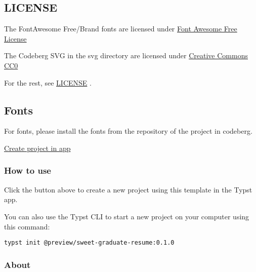 
\subsection{LICENSE}\label{license}

The FontAwesome Free/Brand fonts are licensed under
\href{https://github.com/FortAwesome/Font-Awesome?tab=License-1-ov-file}{Font
Awesome Free License}

The Codeberg SVG in the svg directory are licensed under
\href{https://codeberg.org/Codeberg/Design/src/commit/ac514aa9aaa2457d4af3c3e13df3ab136d22a49a/LICENSE}{Creative
Commons CC0}

For the rest, see
\href{https://github.com/typst/packages/raw/main/packages/preview/sweet-graduate-resume/0.1.0/LICENSE}{LICENSE}
.

\subsection{Fonts}\label{fonts}

For fonts, please install the fonts from the repository of the project
in codeberg.

\href{/app?template=sweet-graduate-resume&version=0.1.0}{Create project
in app}

\subsubsection{How to use}\label{how-to-use}

Click the button above to create a new project using this template in
the Typst app.

You can also use the Typst CLI to start a new project on your computer
using this command:

\begin{verbatim}
typst init @preview/sweet-graduate-resume:0.1.0
\end{verbatim}



\subsubsection{About}\label{about}

